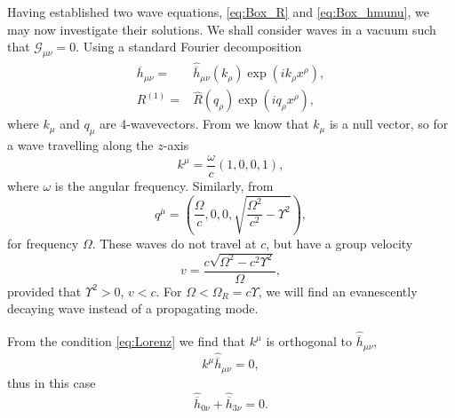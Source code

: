 Having established two wave equations, \eqref{eq:Box_R} and \eqref{eq:Box_hmunu}, we may now investigate their solutions. We shall consider waves in a vacuum such that $\mathcal{G}_{\mu\nu} = 0$. Using a standard Fourier decomposition
\begin{align}
\overline{h}_{\mu\nu} = {} & \widehat{\overline{h}}_{\mu\nu}(k_\rho) \exp\left(ik_\rho x^\rho\right),\\
R^{(1)} = {} & \widehat{R}(q_\rho) \exp\left(iq_\rho x^\rho\right),
\end{align}
where $k_\mu$ and $q_\mu$ are 4-wavevectors. From  we know that $k_\mu$ is a null vector, so for a wave travelling along the $z$-axis
\begin{equation}
k^\mu = \frac{\omega}{c}(1, 0, 0, 1),
\end{equation}
where $\omega$ is the angular frequency. Similarly, from 
\begin{equation}
q^\mu = \left(\frac{\Omega}{c}, 0, 0, \sqrt{\frac{\Omega^2}{c^2} - \Upsilon^2}\right),
\label{eq:Ricci_q}
\end{equation}
for frequency $\Omega$. These waves do not travel at $c$, but have a group velocity
\begin{equation}
v = \frac{c\sqrt{\Omega^2 - c^2\Upsilon^2}}{\Omega},
\end{equation}
provided that $\Upsilon^2 > 0$, $v < c$. For $\Omega < \Omega_R = c\Upsilon$, we will find an evanescently decaying wave instead of a propagating mode.

From the condition \eqref{eq:Lorenz} we find that $k^\mu$ is orthogonal to $\widehat{\overline{h}}_{\mu\nu}$,
\begin{equation}
k^\mu\widehat{\overline{h}}_{\mu\nu} = 0,
\end{equation}
thus in this case
\begin{equation}
\widehat{\overline{h}}_{0\nu} + \widehat{\overline{h}}_{3\nu} = 0.
\label{eq:Transverse}
\end{equation}

